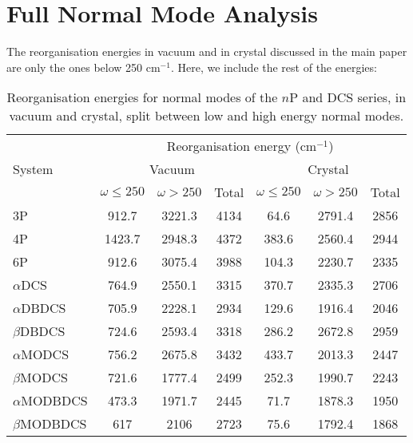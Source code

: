 \section{Full Normal Mode Analysis}
The reorganisation energies in vacuum and in crystal discussed in the main paper are only the ones below 250 cm$^{-1}$. Here, we include the rest of the energies:

\begin{table*}[]
\begin{tabular}{@{}lcccccc@{}}
\toprule
\multirow{3}{*}{System} & \multicolumn{6}{c}{Reorganisation energy (cm$^{-1}$)}                                                 \\\cmidrule(lr){2-7}
                        & \multicolumn{3}{c}{Vacuum}                             & \multicolumn{3}{c}{Crystal}             \\\cmidrule(r){1-1} \cmidrule(lr){2-4} \cmidrule(lr){5-7}
                        & $\omega\leq{}250$ & $\omega>250$ & Total  & $\omega\leq{}250$ & $\omega>250$ & Total  \\\midrule
3P                      & 912.7                & 3221.3                 & 4134   & 64.6           & 2791.4        & 2856   \\
4P                      & 1423.7               & 2948.3                 & 4372   & 383.6          & 2560.4        & 2944   \\
6P                      & 912.6                & 3075.4                 & 3988 & 104.3          & 2230.7        & 2335 \\
$\alpha$DCS                  & 764.9                & 2550.1                 & 3315   & 370.7          & 2335.3        & 2706   \\
$\alpha$DBDCS                & 705.9                & 2228.1                 & 2934   & 129.6          & 1916.4        & 2046   \\
$\beta$DBDCS                & 724.6                & 2593.4                 & 3318   & 286.2          & 2672.8        & 2959   \\
$\alpha$MODCS                & 756.2                & 2675.8                 & 3432   & 433.7          & 2013.3        & 2447   \\
$\beta$MODCS                & 721.6                & 1777.4                 & 2499   & 252.3          & 1990.7        & 2243   \\
$\alpha$MODBDCS              & 473.3                & 1971.7                 & 2445   & 71.7           & 1878.3        & 1950   \\
$\beta$MODBDCS              & 617                  & 2106                   & 2723   & 75.6           & 1792.4        & 1868  \\\bottomrule
\end{tabular}
\caption{Reorganisation energies for normal modes of the $n$P and DCS series, in vacuum and crystal, split between low and high energy normal modes.}
\end{table*}

